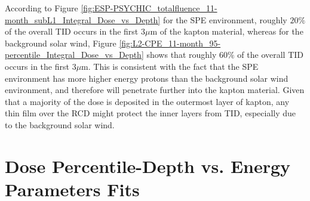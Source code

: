 \documentclass{hitec}
\begin{document}
According to Figure \ref{fig:ESP-PSYCHIC_totalfluence_11-month_subL1_Integral_Dose_vs_Depth} for the SPE environment, roughly $20\%$ of the overall TID occurs in the first $3\mu$m of the kapton material, whereas for the background solar wind, Figure \ref{fig:L2-CPE_11-month_95-percentile_Integral_Dose_vs_Depth} shows that roughly $60\%$ of the overall TID occurs in the first $3\mu$m. This is consistent with the fact that the SPE environment has more higher energy protons than the background solar wind environment, and therefore will penetrate further into the kapton material. Given that a majority of the dose is deposited in the outermost layer of kapton, any thin film over the RCD might protect the inner layers from TID, especially due to the background solar wind. 
\newpage
\appendix

\section{Dose Percentile-Depth vs. Energy Parameters Fits}
\label{App:Dose Percentile-Depth vs. Energy Parameters Fits}
\end{document}
